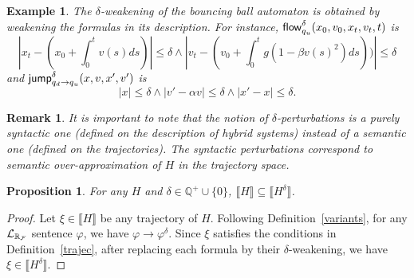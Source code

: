 \documentclass[journal]{IEEEtran}
\newtheorem{example}{Example}
\newtheorem{remark}{Remark}
\newtheorem{proposition}{Proposition}
\begin{document}
\begin{example}
The $\delta$-weakening of the bouncing ball automaton is obtained by weakening the formulas in its description. For instance, $\mathsf{flow}_{q_u}^{\delta}(x_0, v_0, x_t, v_t, t)$ is
{$$|x_t - (x_0 + \int_0^{t} v(s) ds)|\leq \delta \wedge |v_t - (v_0 + \int_0^t g(1-\beta v(s)^2) ds))|\leq \delta$$}
and $\mathsf{jump}_{q_d \rightarrow q_u}^{\delta} (x, v, x', v')$ is {$$|x|\leq \delta \wedge |v' - \alpha v|\leq \delta \wedge |x'-x|\leq \delta.$$}
\end{example}
\begin{remark} It is important to note that the notion of $\delta$-perturbations is a purely syntactic one (defined on the description of hybrid systems) instead of a semantic one (defined on the trajectories). The syntactic perturbations correspond to semantic over-approximation of $H$ in the trajectory space.
\end{remark}
\begin{proposition} For any $H$ and $\delta\in\mathbb{Q}^+\cup\{0\}$, $\llbracket H\rrbracket\subseteq \llbracket H^{\delta}\rrbracket$.
\end{proposition}
\begin{proof}
Let $\xi\in \llbracket H\rrbracket$ be any trajectory of $H$. Following
Definition~\ref{variants}, for any $\mathcal{L}_{\mathbb{R}_{\mathcal{F}}}$ sentence $\varphi$, we have
$\varphi\rightarrow\varphi^{\delta}$. Since
$\xi$ satisfies the conditions in Definition~\ref{trajec}, after replacing each
formula by their $\delta$-weakening, we have $\xi\in \llbracket H^{\delta}\rrbracket$.
\end{proof}
\end{document}
